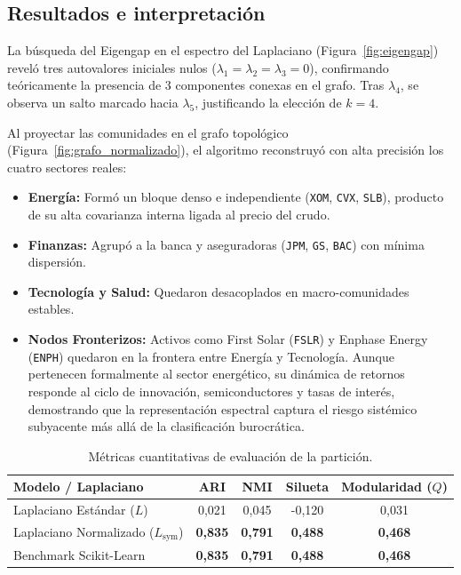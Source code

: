 \documentclass{article}
\begin{document}
	\subsection*{Resultados e interpretación}
	La búsqueda del Eigengap en el espectro del Laplaciano (Figura~\ref{fig:eigengap}) reveló tres autovalores iniciales nulos (\(\lambda_1 = \lambda_2 = \lambda_3 = 0\)), confirmando teóricamente la presencia de 3 componentes conexas en el grafo. Tras \(\lambda_4\), se observa un salto marcado hacia \(\lambda_5\), justificando la elección de \(k=4\).
	
	Al proyectar las comunidades en el grafo topológico (Figura~\ref{fig:grafo_normalizado}), el algoritmo reconstruyó con alta precisión los cuatro sectores reales:
	\begin{itemize}
		\item \textbf{Energía:} Formó un bloque denso e independiente (\texttt{XOM}, \texttt{CVX}, \texttt{SLB}), producto de su alta covarianza interna ligada al precio del crudo.
		\item \textbf{Finanzas:} Agrupó a la banca y aseguradoras (\texttt{JPM}, \texttt{GS}, \texttt{BAC}) con mínima dispersión.
		\item \textbf{Tecnología y Salud:} Quedaron desacoplados en macro-comunidades estables.
		\item \textbf{Nodos Fronterizos:} Activos como First Solar (\texttt{FSLR}) y Enphase Energy (\texttt{ENPH}) quedaron en la frontera entre Energía y Tecnología. Aunque pertenecen formalmente al sector energético, su dinámica de retornos responde al ciclo de innovación, semiconductores y tasas de interés, demostrando que la representación espectral captura el riesgo sistémico subyacente más allá de la clasificación burocrática.
	\end{itemize}
	
	\begin{table}[h!]
		\centering
		\small
		\begin{tabular}{lcccc}
			\hline
			\textbf{Modelo / Laplaciano} & \textbf{ARI} & \textbf{NMI} & \textbf{Silueta} & \textbf{Modularidad (\(Q\))} \\ \hline
			Laplaciano Estándar (\(L\)) & 0,021 & 0,045 & -0,120 & 0,031 \\
			Laplaciano Normalizado (\(L_{\text{sym}}\)) & \textbf{0,835} & \textbf{0,791} & \textbf{0,488} & \textbf{0,468} \\
			Benchmark Scikit-Learn & \textbf{0,835} & \textbf{0,791} & \textbf{0,488} & \textbf{0,468} \\ \hline
		\end{tabular}
		\caption{Métricas cuantitativas de evaluación de la partición.}
		\label{tab:metricas}
	\end{table}
\end{document}
